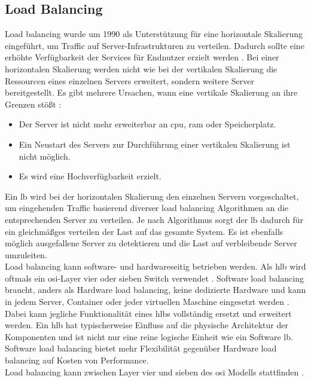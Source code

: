 \subsection{Load Balancing} \label{s:load-balancing}
Load balancing wurde um 1990 als Unterstützung für eine horizontale Skalierung eingeführt, um Traffic auf Server-Infrastrukturen zu verteilen. Dadurch sollte eine erhöhte Verfügbarkeit der Services für Endnutzer erzielt werden \cite{LoadBalancing101}.
Bei einer horizontalen Skalierung werden nicht wie bei der vertikalen Skalierung die Ressourcen eines einzelnen Servers erweitert, sondern weitere Server bereitgestellt. Es gibt mehrere Ursachen, wann eine vertikale Skalierung an ihre Grenzen stö{\ss}t \cite{bourkeServerLoadBalancing2001}:
\begin{itemize}
    \item Der Server ist nicht mehr erweiterbar an \acs{cpu}, \acs{ram} oder Speicherplatz.
    \item Ein Neustart des Servers zur Durchführung einer vertikalen Skalierung ist nicht möglich.
    \item Es wird eine Hochverfügbarkeit erzielt.
\end{itemize}
Ein \acl{lb} wird bei der horizontalen Skalierung den einzelnen Servern vorgeschaltet, um eingehenden Traffic basierend diverser load balancing Algorithmen an die entsprechenden Server zu verteilen.
Je nach Algorithmus sorgt der \ac{lb} dadurch für ein gleichmä{\ss}ges verteilen der Last auf das gesamte System. Es ist ebenfalls möglich ausgefallene Server zu detektieren und die Last auf verbleibende Server umzuleiten.
\cite{LoadBalancing101}
\\
Load balancing kann software- und hardwareseitig betrieben werden. Als \ac{hlb} wird oftmals ein \acs{osi}-Layer vier oder sieben Switch verwendet \cite{WasIstLoad2016}.
Software load balancing braucht, anders als Hardware load balancing, keine dedizierte Hardware und kann in jedem Server, Container oder jeder virtuellen Maschine eingesetzt werden \cite{SoftwareLoadBalancing}.
Dabei kann jegliche Funktionalität eines \acp{hlb} vollständig ersetzt und erweitert werden.
Ein \ac{hlb} hat typischerweise Einfluss auf die physische Architektur der Komponenten und ist nicht nur eine reine logische Einheit wie ein Software \ac{lb}.
Software load balancing bietet mehr Flexibilität gegenüber Hardware load balancing auf Kosten von Performance.
\cite{WhatLoadBalancer}
\\
Load balancing kann zwischen Layer vier und sieben des \ac{osi} Modells stattfinden \cite{WhatLoadBalancer}.
